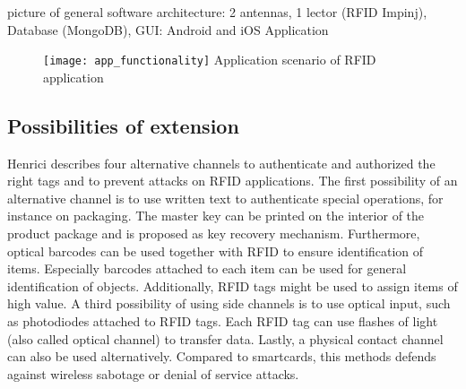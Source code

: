 picture of general software architecture: 
2 antennas, 1 lector (RFID Impinj), Database (MongoDB), GUI: Android and  iOS Application 


\begin{figure}
\centering
\texttt{[image: app\_functionality]} Application scenario of RFID application 
\caption{\label{fig:appfunctionality}} 
\end{figure}

\subsection{Possibilities of extension}

Henrici \cite[p.121 ff.]{henrici} describes four alternative channels to authenticate and authorized the right tags and to prevent attacks on RFID applications. 
The first possibility of an alternative channel is to use written text to authenticate special operations, for instance on packaging. The master key can be printed on the interior of the product package and is proposed as key recovery mechanism.
Furthermore, optical barcodes can be used together with RFID to ensure identification of items. Especially barcodes attached to each item can be used for general identification of objects. Additionally, RFID tags might be used to assign items of high value.
A third possibility of using side channels is to use optical input, such as photodiodes attached to RFID tags. Each RFID tag can use flashes of light (also called optical channel) to transfer data.   
Lastly, a physical contact channel can also be used alternatively. Compared to smartcards, this methods defends against wireless sabotage or denial of service attacks.


















 
